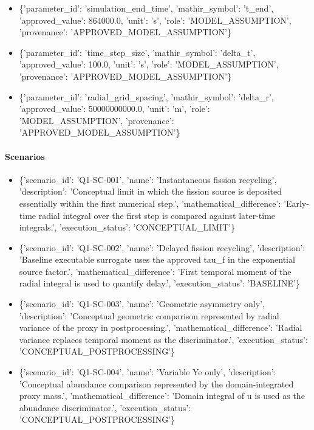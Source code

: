 \documentclass[11pt]{article}
\begin{document}
\begin{itemize}
\item \{'parameter\_\allowbreak{}id': 'simulation\_\allowbreak{}end\_\allowbreak{}time', 'mathir\_\allowbreak{}symbol': 't\_\allowbreak{}end', 'approved\_\allowbreak{}value': 864000.0, 'unit': 's', 'role': 'MODEL\_\allowbreak{}ASSUMPTION', 'provenance': 'APPROVED\_\allowbreak{}MODEL\_\allowbreak{}ASSUMPTION'\}
\item \{'parameter\_\allowbreak{}id': 'time\_\allowbreak{}step\_\allowbreak{}size', 'mathir\_\allowbreak{}symbol': 'delta\_\allowbreak{}t', 'approved\_\allowbreak{}value': 100.0, 'unit': 's', 'role': 'MODEL\_\allowbreak{}ASSUMPTION', 'provenance': 'APPROVED\_\allowbreak{}MODEL\_\allowbreak{}ASSUMPTION'\}
\item \{'parameter\_\allowbreak{}id': 'radial\_\allowbreak{}grid\_\allowbreak{}spacing', 'mathir\_\allowbreak{}symbol': 'delta\_\allowbreak{}r', 'approved\_\allowbreak{}value': 50000000000.0, 'unit': 'm', 'role': 'MODEL\_\allowbreak{}ASSUMPTION', 'provenance': 'APPROVED\_\allowbreak{}MODEL\_\allowbreak{}ASSUMPTION'\}
\end{itemize}

\paragraph{Scenarios}
\begin{itemize}\raggedright
\item \{'scenario\_\allowbreak{}id': 'Q1-SC-001', 'name': 'Instantaneous fission recycling', 'description': 'Conceptual limit in which the fission source is deposited essentially within the first numerical step.', 'mathematical\_\allowbreak{}difference': 'Early-time radial integral over the first step is compared against later-time integrals.', 'execution\_\allowbreak{}status': 'CONCEPTUAL\_\allowbreak{}LIMIT'\}
\item \{'scenario\_\allowbreak{}id': 'Q1-SC-002', 'name': 'Delayed fission recycling', 'description': 'Baseline executable surrogate uses the approved tau\_\allowbreak{}f in the exponential source factor.', 'mathematical\_\allowbreak{}difference': 'First temporal moment of the radial integral is used to quantify delay.', 'execution\_\allowbreak{}status': 'BASELINE'\}
\item \{'scenario\_\allowbreak{}id': 'Q1-SC-003', 'name': 'Geometric asymmetry only', 'description': 'Conceptual geometric comparison represented by radial variance of the proxy in postprocessing.', 'mathematical\_\allowbreak{}difference': 'Radial variance replaces temporal moment as the discriminator.', 'execution\_\allowbreak{}status': 'CONCEPTUAL\_\allowbreak{}POSTPROCESSING'\}
\item \{'scenario\_\allowbreak{}id': 'Q1-SC-004', 'name': 'Variable Ye only', 'description': 'Conceptual abundance comparison represented by the domain-integrated proxy mass.', 'mathematical\_\allowbreak{}difference': 'Domain integral of u is used as the abundance discriminator.', 'execution\_\allowbreak{}status': 'CONCEPTUAL\_\allowbreak{}POSTPROCESSING'\}
\end{itemize}
\end{document}

